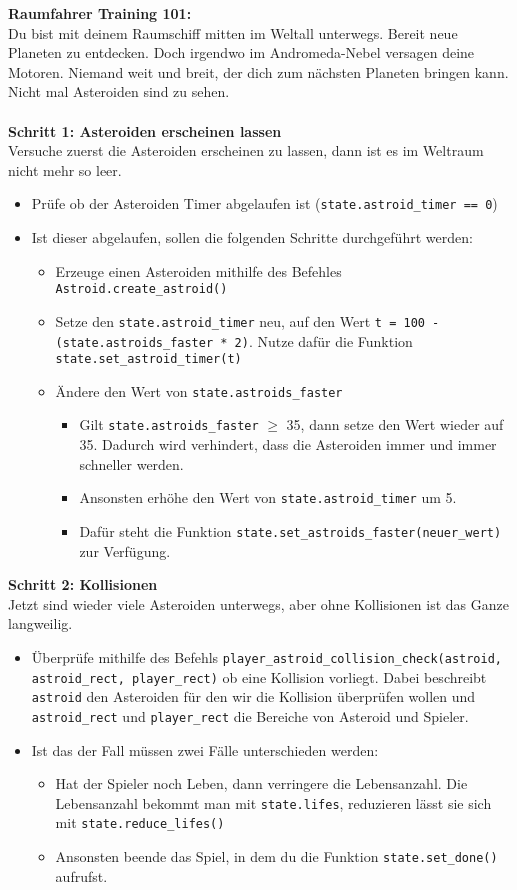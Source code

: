\textbf{\large Raumfahrer Training 101:}\\
Du bist mit deinem Raumschiff mitten im Weltall unterwegs. Bereit neue Planeten zu entdecken. Doch irgendwo im Andromeda-Nebel versagen deine Motoren. Niemand weit und breit, der dich zum nächsten Planeten bringen kann. Nicht mal Asteroiden sind zu sehen.\\\\
\textbf{Schritt 1: Asteroiden erscheinen lassen}\\
Versuche zuerst die Asteroiden erscheinen zu lassen, dann ist es im Weltraum nicht mehr so leer.
\begin{itemize}
	\item Prüfe ob der Asteroiden Timer abgelaufen ist (\texttt{state.astroid\_timer == 0})
	\item Ist dieser abgelaufen, sollen die folgenden Schritte durchgeführt werden:
	\begin{itemize}
		\item Erzeuge einen Asteroiden mithilfe des Befehles \texttt{Astroid.create\_astroid()} \item Setze den \texttt{state.astroid\_timer} neu, auf den Wert \texttt{t = 100 - (state.astroids\_faster * 2)}. Nutze dafür die Funktion \texttt{state.set\_astroid\_timer(t)}
		\item Ändere den Wert von \texttt{state.astroids\_faster}
		\begin{itemize}
			\item Gilt \texttt{state.astroids\_faster} $\geq$ 35, dann setze den Wert wieder auf 35. Dadurch wird verhindert, dass die Asteroiden immer und immer schneller werden.
			\item Ansonsten erhöhe den Wert von \texttt{state.astroid\_timer} um 5.
			\item Dafür steht die Funktion \texttt{state.set\_astroids\_faster(neuer\_wert)} zur Verfügung.
		\end{itemize}
	\end{itemize}
\end{itemize}
\textbf{Schritt 2: Kollisionen}\\
Jetzt sind wieder viele Asteroiden unterwegs, aber ohne Kollisionen ist das Ganze langweilig.
\begin{itemize}
	\item Überprüfe mithilfe des Befehls \texttt{player\_astroid\_collision\_check(astroid, astroid\_rect, player\_rect)} ob eine Kollision vorliegt. Dabei beschreibt \texttt{astroid} den Asteroiden für den wir die Kollision überprüfen wollen und \texttt{astroid\_rect} und \texttt{player\_rect} die Bereiche von Asteroid und Spieler.
	\item Ist das der Fall müssen zwei Fälle unterschieden werden:
	\begin{itemize}
		\item Hat der Spieler noch Leben, dann verringere die Lebensanzahl. Die Lebensanzahl bekommt man mit \texttt{state.lifes}, reduzieren lässt sie sich mit \texttt{state.reduce\_lifes()}
		\item Ansonsten beende das Spiel, in dem du die Funktion \texttt{state.set\_done()} aufrufst.
	\end{itemize}
\end{itemize}
